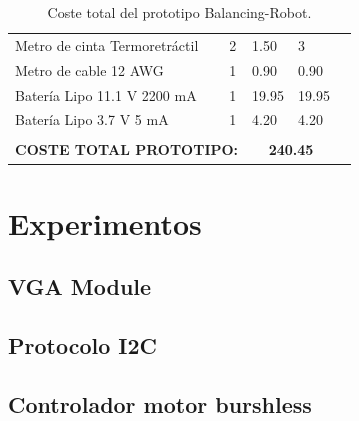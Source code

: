 \begin{table}[H]
\begin{tabular}{|l|l|l|l|l}
		Metro de cinta Termoretráctil                                   & 2                                         & 1.50                                                                                                                & 3                                                                                                                &  \\ \cline{1-4}
		Metro de cable 12 AWG                                           & 1                                         & 0.90                                                                                                                & 0.90                                                                                                             &  \\ \cline{1-4}
		Batería Lipo 11.1 V 2200 mA                                     & 1                                         & 19.95                                                                                                               & 19.95                                                                                                            &  \\ \cline{1-4}
		Batería Lipo 3.7 V 5 mA                                         & 1                                         & 4.20                                                                                                                & 4.20                                                                                                             &  \\ \cline{1-4}
		\multicolumn{2}{|c|}{}                                                                                      & \multicolumn{2}{c|}{\cellcolor[HTML]{FD6864}}                                                                                                                                                                                          &  \\
		\multicolumn{2}{|c|}{\multirow{-2}{*}{\textbf{COSTE TOTAL PROTOTIPO:}}}                                     & \multicolumn{2}{c|}{\multirow{-2}{*}{\cellcolor[HTML]{FD6864}\textbf{240.45}}}                                                                                                                                                         &  \\ \cline{1-4}
	\end{tabular}
	\caption{Coste total del prototipo Balancing-Robot.}
	\label{tabla:coste}
\end{table}

\section{Experimentos}
\subsection{VGA Module}
\subsection{Protocolo I2C}
\subsection{Controlador motor burshless}